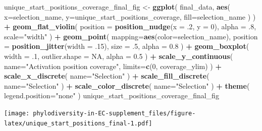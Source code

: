 \documentclass[]{book}
\newenvironment{Shaded}{\begin{snugshade}}{\end{snugshade}}
\newcommand{\DataTypeTok}[1]{\textcolor[rgb]{0.13,0.29,0.53}{#1}}
\newcommand{\DecValTok}[1]{\textcolor[rgb]{0.00,0.00,0.81}{#1}}
\newcommand{\FloatTok}[1]{\textcolor[rgb]{0.00,0.00,0.81}{#1}}
\newcommand{\KeywordTok}[1]{\textcolor[rgb]{0.13,0.29,0.53}{\textbf{#1}}}
\newcommand{\NormalTok}[1]{#1}
\newcommand{\OperatorTok}[1]{\textcolor[rgb]{0.81,0.36,0.00}{\textbf{#1}}}
\newcommand{\OtherTok}[1]{\textcolor[rgb]{0.56,0.35,0.01}{#1}}
\newcommand{\StringTok}[1]{\textcolor[rgb]{0.31,0.60,0.02}{#1}}
\begin{document}
\begin{Shaded}
\begin{Highlighting}[]
\NormalTok{unique_start_positions_coverage_final_fig <-}\StringTok{ }\KeywordTok{ggplot}\NormalTok{(}
\NormalTok{    final_data,}
    \KeywordTok{aes}\NormalTok{(}
      \DataTypeTok{x=}\NormalTok{selection_name,}
      \DataTypeTok{y=}\NormalTok{unique_start_positions_coverage,}
      \DataTypeTok{fill=}\NormalTok{selection_name}
\NormalTok{    )}
\NormalTok{  ) }\OperatorTok{+}
\StringTok{  }\KeywordTok{geom_flat_violin}\NormalTok{(}
    \DataTypeTok{position =} \KeywordTok{position_nudge}\NormalTok{(}\DataTypeTok{x =} \FloatTok{.2}\NormalTok{, }\DataTypeTok{y =} \DecValTok{0}\NormalTok{),}
    \DataTypeTok{alpha =} \FloatTok{.8}\NormalTok{,}
    \DataTypeTok{scale=}\StringTok{"width"}
\NormalTok{  ) }\OperatorTok{+}
\StringTok{  }\KeywordTok{geom_point}\NormalTok{(}
    \DataTypeTok{mapping=}\KeywordTok{aes}\NormalTok{(}\DataTypeTok{color=}\NormalTok{selection_name),}
    \DataTypeTok{position =} \KeywordTok{position_jitter}\NormalTok{(}\DataTypeTok{width =} \FloatTok{.15}\NormalTok{),}
    \DataTypeTok{size =} \FloatTok{.5}\NormalTok{,}
    \DataTypeTok{alpha =} \FloatTok{0.8}
\NormalTok{  ) }\OperatorTok{+}
\StringTok{  }\KeywordTok{geom_boxplot}\NormalTok{(}
    \DataTypeTok{width =} \FloatTok{.1}\NormalTok{,}
    \DataTypeTok{outlier.shape =} \OtherTok{NA}\NormalTok{,}
    \DataTypeTok{alpha =} \FloatTok{0.5}
\NormalTok{  ) }\OperatorTok{+}
\StringTok{  }\KeywordTok{scale_y_continuous}\NormalTok{(}
    \DataTypeTok{name=}\StringTok{"Activation position coverage"}\NormalTok{,}
    \DataTypeTok{limits=}\KeywordTok{c}\NormalTok{(}\DecValTok{0}\NormalTok{, coverage_ylim)}
\NormalTok{  ) }\OperatorTok{+}
\StringTok{  }\KeywordTok{scale_x_discrete}\NormalTok{(}
    \DataTypeTok{name=}\StringTok{"Selection"}
\NormalTok{  ) }\OperatorTok{+}
\StringTok{  }\KeywordTok{scale_fill_discrete}\NormalTok{(}
    \DataTypeTok{name=}\StringTok{"Selection"}
\NormalTok{  ) }\OperatorTok{+}
\StringTok{  }\KeywordTok{scale_color_discrete}\NormalTok{(}
    \DataTypeTok{name=}\StringTok{"Selection"}
\NormalTok{  ) }\OperatorTok{+}
\StringTok{  }\KeywordTok{theme}\NormalTok{(}
    \DataTypeTok{legend.position=}\StringTok{"none"}
\NormalTok{  )}
\NormalTok{unique_start_positions_coverage_final_fig}
\end{Highlighting}
\end{Shaded}

\texttt{[image: phylodiversity-in-EC-supplement\_files/figure-latex/unique\_start\_positions\_final-1.pdf]}
\end{document}
